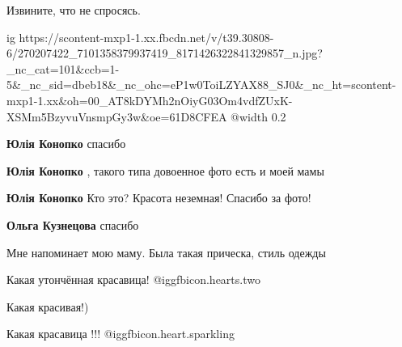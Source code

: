  
 
 
 
 


Извините, что не спросясь.

\ifcmt
  ig https://scontent-mxp1-1.xx.fbcdn.net/v/t39.30808-6/270207422_7101358379937419_8171426322841329857_n.jpg?_nc_cat=101&ccb=1-5&_nc_sid=dbeb18&_nc_ohc=eP1w0ToiLZYAX88_SJ0&_nc_ht=scontent-mxp1-1.xx&oh=00_AT8kDYMh2nOiyG03Om4vdfZUxK-XSMm5BzyvuVnsmpGy3w&oe=61D8CFEA
  @width 0.2
\fi

\textbf{Юлія Конопко} спасибо

\textbf{Юлія Конопко} , такого типа довоенное фото есть и моей мамы

\textbf{Юлія Конопко} Кто это? Красота неземная! Спасибо за фото!

\textbf{Ольга Кузнецова} спасибо

Мне напоминает мою маму. Была такая прическа, стиль одежды

Какая утончённая красавица! @igg{fbicon.hearts.two} 

Какая красивая!)

Какая красавица !!!  @igg{fbicon.heart.sparkling} 
